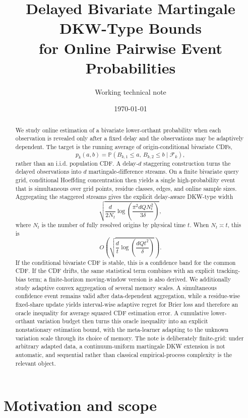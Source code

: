 \documentclass[11pt]{article}
\title{Delayed Bivariate Martingale DKW-Type Bounds\\
for Online Pairwise Event Probabilities}
\author{Working technical note}
\date{\today}
\newcommand{\Pp}{\mathbb{P}}
\newcommand{\F}{\mathcal{F}}
\newcommand{\1}{\mathbf{1}}
\begin{document}
\maketitle

\begin{abstract}
We study online estimation of a bivariate lower-orthant probability when each
observation is revealed only after a fixed delay and the observations may be
adaptively dependent.  The target is the running average of origin-conditional
bivariate CDFs,
\[
    p_k(a,b)
    =
    \Pp(B_{k,1}\le a,\,B_{k,2}\le b\mid \F_k),
\]
rather than an i.i.d. population CDF.  A delay-$d$ staggering construction
turns the delayed observations into $d$ martingale-difference streams.  On a
finite bivariate query grid, conditional Hoeffding concentration then yields a
single high-probability event that is simultaneous over grid points, residue
classes, edges, and online sample sizes.  Aggregating the staggered streams
gives the explicit delay-aware DKW-type width
\[
    \sqrt{
        \frac{d}{2N_t}
        \log\!\left(
            \frac{\pi^2 dQ N_t^2}{3\delta}
        \right)
    },
\]
where $N_t$ is the number of fully resolved origins by physical time $t$.
When $N_t\asymp t$, this is
\[
    O\!\left(
        \sqrt{
            \frac{d}{t}
            \log\!\left(\frac{dQt^2}{\delta}\right)
        }
    \right).
\]
If the conditional bivariate CDF is stable, this is a confidence band for the
common CDF.  If the CDF drifts, the same statistical term combines with an
explicit tracking-bias term; a finite-horizon moving-window version is also
derived.  We additionally study adaptive convex aggregation of several memory
scales.  A simultaneous confidence event remains valid after data-dependent
aggregation, while a residue-wise fixed-share update yields interval-wise
adaptive regret for Brier loss and therefore an oracle inequality for average
squared CDF estimation error.  A cumulative lower-orthant variation budget then
turns this oracle inequality into an explicit nonstationary estimation bound,
with the meta-learner adapting to the unknown variation scale through its choice
of memory.  The note is deliberately finite-grid: under
arbitrary adapted data, a continuum-uniform martingale DKW extension is not
automatic, and sequential rather than classical empirical-process complexity
is the relevant object.
\end{abstract}

\section{Motivation and scope}
\end{document}
